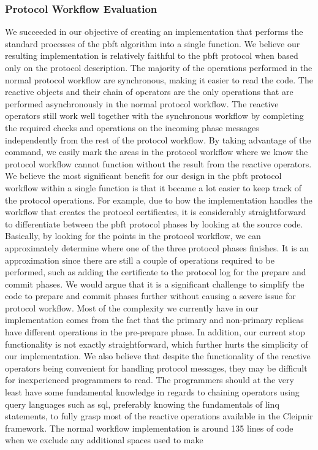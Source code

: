 \subsubsection{Protocol Workflow Evaluation}
We succeeded in our objective of creating an implementation that performs the standard processes of the \ac{pbft} algorithm into a single function. We believe our resulting implementation is relatively faithful to the \ac{pbft} protocol when based only on the protocol description. The majority of the operations performed in the normal protocol workflow are synchronous, making it easier to read the code. The reactive  objects and their chain of operators are the only operations that are performed asynchronously in the normal protocol workflow. The reactive operators still work well together with the synchronous workflow by completing the required checks and operations on the incoming phase messages independently from the rest of the protocol workflow. By taking advantage of the  command, we easily mark the areas in the protocol workflow where we know the protocol workflow cannot function without the result from the reactive operators. We believe the most significant benefit for our design in the \ac{pbft} protocol workflow within a single function is that it became a lot easier to keep track of the protocol operations. For example, due to how the implementation handles the workflow that creates the protocol certificates, it is considerably straightforward to differentiate between the \ac{pbft} protocol phases by looking at the source code. Basically, by looking for the  points in the protocol workflow, we can approximately determine where one of the three protocol phases finishes. It is an approximation since there are still a couple of operations required to be performed, such as adding the certificate to the protocol log for the prepare and commit phases.  We would argue that it is a significant challenge to simplify the code to prepare and commit phases further without causing a severe issue for protocol workflow. Most of the complexity we currently have in our implementation comes from the fact that the primary and non-primary replicas have different operations in the pre-prepare phase. In addition, our current stop functionality is not exactly straightforward, which further hurts the simplicity of our implementation. We also believe that despite the functionality of the reactive operators being convenient for handling protocol messages, they may be difficult for inexperienced programmers to read. The programmers should at the very least have some fundamental knowledge in regards to chaining operators using query languages such as \ac{sql}, preferably knowing the fundamentals of \ac{linq}~\cite{WEB:sql} statements, to fully grasp most of the reactive operations available in the Cleipnir framework. The normal workflow implementation is around 135 lines of code when we exclude any additional spaces used to make 